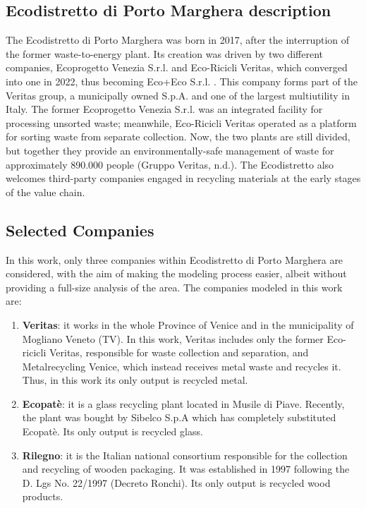 \subsection{Ecodistretto di Porto Marghera description}
The Ecodistretto di Porto Marghera was born in 2017, after the interruption of the former waste-to-energy plant. Its creation was driven by two different companies, Ecoprogetto Venezia S.r.l. and Eco-Ricicli Veritas, which converged into one in 2022, thus becoming Eco+Eco S.r.l. . This company forms part of the Veritas group, a municipally owned S.p.A. and one of the largest multiutility in Italy. The former Ecoprogetto Venezia S.r.l. was an integrated facility for processing unsorted waste; meanwhile, Eco-Ricicli Veritas operated as a platform for sorting waste from separate collection. Now, the two plants are still divided, but together they provide an environmentally-safe management of waste for approximately 890.000 people (Gruppo Veritas, n.d.). The Ecodistretto also welcomes third-party companies engaged in recycling materials at the early stages of the value chain.

\subsection{Selected Companies}
 In this work, only three companies within Ecodistretto di Porto Marghera are considered, with the aim of making the modeling process easier, albeit without providing a full-size analysis of the area. The companies modeled in this work are: 
 \begin{enumerate}[leftmargin=*]
    \item \textbf{Veritas}: it works in the whole Province of Venice and in the municipality of Mogliano Veneto (TV). In this work, Veritas includes only the former Eco-ricicli Veritas, responsible for waste collection and separation, and Metalrecycling Venice, which instead receives metal waste and recycles it. Thus, in this work its only output is \textcolor{sapienza}{recycled metal}. 
    \item \textbf{Ecopatè}: it is a glass recycling plant located in Musile di Piave. Recently, the plant was bought by Sibelco S.p.A which has completely substituted Ecopatè. Its only output is \textcolor{sapienza}{recycled glass}. 
    \item \textbf{Rilegno}: it is the Italian national consortium responsible for the collection and recycling of wooden packaging. It was established in 1997 following the D. Lgs No. 22/1997 (Decreto Ronchi). Its only output is \textcolor{sapienza}{recycled wood products}. 
 \end{enumerate}